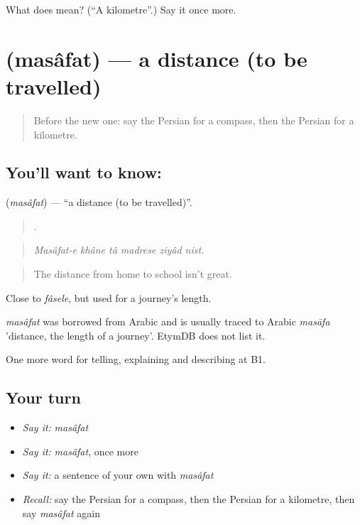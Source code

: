 \begin{tcolorbox}[breakable,colback=teal!4,colframe=teal!35!black,title={Before you move on}]
What does  mean? (\textquotedblleft{}A kilometre\textquotedblright{}.) Say it once more.
\end{tcolorbox}
\section[\texorpdfstring{\fa{مسافت} (masâfat)}{مسافت (masâfat)}]{ (masâfat) — a distance (to be travelled)}

\label{lesson:FA-C446-masafat}



\begin{quote}
Before the new one: say the Persian for a compass, then the Persian for a kilometre.
\end{quote}

\subsection*{You'll want to know: }
\textbf{} (\emph{masâfat}) — \textquotedblleft{}a distance (to be travelled)\textquotedblright{}.

\begin{quote}
     .
\end{quote}

\begin{quote}
\emph{Masâfat-e khâne tâ madrese ziyâd nist.}
\end{quote}

\begin{quote}
The distance from home to school isn't great.
\end{quote}

Close to \emph{fâsele}, but used for a journey's length.

\begin{cousinweb}
\emph{masâfat} was borrowed from Arabic and is usually traced to Arabic \emph{masāfa} 'distance, the length of a journey'. EtymDB does not list it.
\end{cousinweb}

\begin{grammarlens}[title={What you've built}]
One more word for telling, explaining and describing at B1.
\end{grammarlens}

\subsection*{Your turn}
\begin{itemize}
\raggedright
  \item \emph{Say it:} \emph{masâfat}
  \item \emph{Say it:} \emph{masâfat}, once more
  \item \emph{Say it:} a sentence of your own with \emph{masâfat}
  \item \emph{Recall:} say the Persian for a compass, then the Persian for a kilometre, then say \emph{masâfat} again
\end{itemize}

